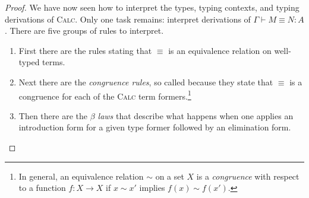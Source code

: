 \begin{proof}
  We have now seen how to interpret the types,
  typing contexts, and typing derivations of \textsc{Calc}.
  Only one task remains: interpret derivations of
  \(\Gamma \vdash M \equiv N : A\).
  There are five groups of rules to interpret.
  \begin{enumerate}
  \item First there are the rules stating that \(\equiv\)
    is an equivalence relation on well-typed terms.
  \item Next there are the \emph{congruence rules},
    so called because they state that \(\equiv\)
    is a congruence for each of the \textsc{Calc} term formers.\footnote{%
     In general, an equivalence relation \(\sim\) on a set \(X\)
     is a \emph{congruence} with respect to a function
     \(f : X \to X\) if \(x \sim x'\) implies \(f(x) \sim f(x')\).}
  \item Then there are the \emph{\(\beta\) laws}
    that describe what happens when one applies an introduction
    form for a given type former followed by an elimination form.
    \begin{mathpar}

\end{mathpar}
\end{enumerate}
\end{proof}
